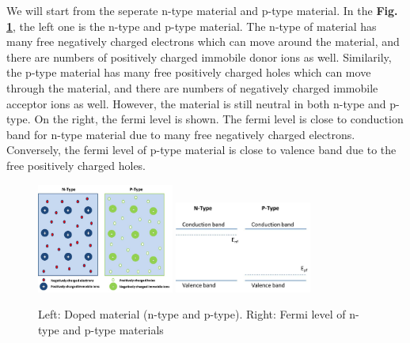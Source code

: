 \documentclass[a4paper, 12pt, titlepage,oneside,drop]{kthesis}
\begin{document}
We will start from the seperate n-type material and p-type material. In the \textbf{Fig. \ref{dopedmaterials}}, the left one is the n-type and p-type material. The n-type of material has many free negatively charged electrons which can move around the material, and there are numbers of positively 
charged immobile donor ions as well. Similarily, the p-type material has many free positively charged holes which can move through the material, and there are numbers of negatively charged immobile acceptor ions as well. However,
the material is still neutral in both n-type and p-type. On the right, the fermi level is shown. The fermi level is close to conduction band for n-type material due to many free negatively charged electrons. Conversely, the fermi level
of p-type material is close to valence band due to the free positively charged holes.



\begin{figure}[H]
    \begin{center}
            \includegraphics[width=0.4\textwidth,clip]{sepratepn.jpg}
            \includegraphics[width=0.4\textwidth,clip]{sepratepn1.jpg}
     \end{center}
    \caption{Left: Doped material (n-type and p-type). Right: Fermi level of n-type and p-type materials}      
    \label{dopedmaterials}
\end{figure}
\end{document}

